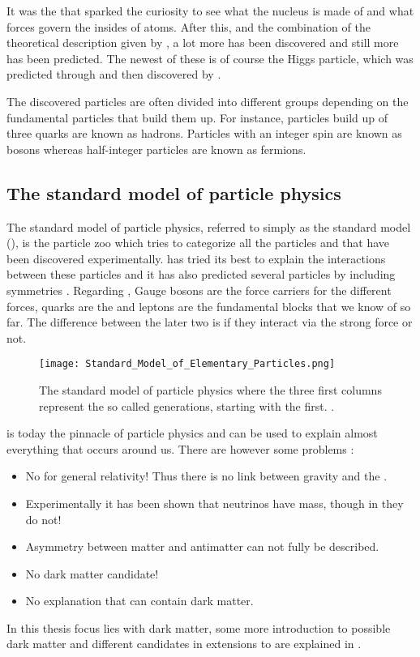 It was the that sparked the curiosity to see what the nucleus is made of and what forces govern the insides of atoms. After this, and the combination of the theoretical description given by \abbrQM, a lot more has been discovered and still more has been predicted. The newest of these is of course the Higgs particle, which was predicted through \abbrQFT and then discovered by \abbrCERN \citep{Higgs:2012}. 

The discovered particles are often divided into different groups depending on the fundamental particles that build them up. For instance, particles build up of three quarks are known as hadrons. Particles with an integer spin are known as bosons whereas half-integer particles are known as fermions.

\subsection{The standard model of particle physics}\label{sec:tb:subsec:SM}
The standard model of particle physics, referred to simply as the standard model (\abbrSM), is the particle zoo which tries to categorize all the particles and that have been discovered experimentally. \abbrQFT has tried its best to explain the interactions between these particles and it has also predicted several particles by including symmetries \citep{Burchan:1995}. Regarding \abbrSM, Gauge bosons are the force carriers for the different forces, quarks are the and leptons are the fundamental blocks that we know of so far. The difference between the later two is if they interact via the strong force or not. 
\begin{SCfigure}[][h]
 \centering
\texttt{[image: Standard\_Model\_of\_Elementary\_Particles.png]}
  \caption{{\small The standard model of particle physics where the three first columns represent the so called generations, starting with the first. \citep{wiki1}.}}
    \label{fig:SM}
\end{SCfigure}

\abbrSM is today the pinnacle of particle physics and can be used to explain almost everything that occurs around us. There are however some problems \citep{Jungman:1996}:
\begin{itemize}
\item No \abbrQFT for general relativity! Thus there is no link between gravity and the \abbrSM.
\item Experimentally it has been shown that neutrinos have mass, though in \abbrSM they do not!
\item Asymmetry between matter and antimatter can not fully be described.
\item No dark matter candidate!
\item No explanation that can contain dark matter.
\end{itemize} 
In this thesis focus lies with dark matter, some more introduction to possible dark matter and different candidates in extensions to \abbrSM are explained in .


